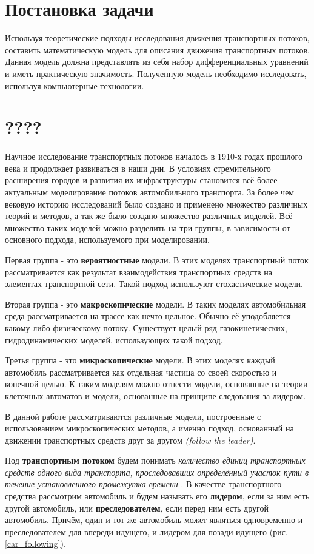 \documentclass[12pt, a4paper]{extarticle}
\numberwithin{equation}{section}
\begin{document}
\newpage
\section{Постановка задачи} 
Используя теоретические подходы исследования движения транспортных потоков, составить математическую модель для описания движения транспортных потоков. Данная модель должна представлять из себя набор дифференциальных уравнений и иметь практическую значимость. Полученную модель необходимо исследовать, используя компьютерные технологии.   

\newpage
\section{????}
Научное исследование транспортных потоков началось в 1910-х годах прошлого века и продолжает развиваться в наши дни. В условиях стремительного расширения городов и развития их инфраструктуры становится всё более актуальным моделирование потоков автомобильного транспорта. За более чем вековую историю исследований было создано и применено множество различных теорий и методов, а так же было создано множество различных моделей. Всё множество таких моделей можно разделить на три группы, в зависимости от основного подхода, используемого при моделировании.

Первая группа - это \textbf{вероятностные} модели. В этих моделях транспортный поток рассматривается как результат взаимодействия транспортных средств на элементах транспортной сети.
Такой подход используют стохастические модели.

Вторая группа - это \textbf{макроскопические} модели. В таких моделях автомобильная среда рассматривается на трассе как нечто цельное. Обычно её уподобляется какому-либо физическому потоку. Существует целый ряд газокинетических, гидродинамических моделей, использующих такой подход.

Третья группа - это \textbf{микроскопические} модели. В этих моделях каждый автомобиль рассматривается как отдельная частица со своей скоростью и конечной целью. К таким моделям можно отнести модели, основанные на теории клеточных автоматов и модели, основанные на принципе следования за лидером.

В данной работе рассматриваются различные модели, построенные с использованием микроскопических методов, а именно подход, основанный на движении транспортных средств друг за другом {\it(follow the leader)}.

Под \textbf{транспортным потоком} будем понимать {\it количество единиц транспортных средств одного вида транспорта, проследовавших определённый участок пути в течение установленного промежутка времени} \cite{TrafficFlow}. В качестве транспортного средства рассмотрим автомобиль и будем называть его \textbf{лидером}, если за ним есть другой автомобиль, или \textbf{преследователем}, если перед ним есть другой автомобиль. Причём, один и тот же автомобиль может являться одновременно и преследователем для впереди идущего, и лидером для позади идущего (рис. \ref{car_following}). 
\end{document}
